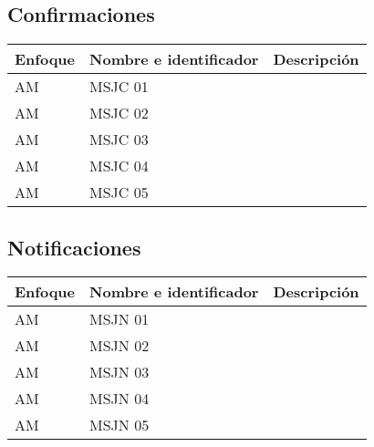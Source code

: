 \subsection{Confirmaciones}
  \begin{center}
   \begin{tabular}{|p{1.5cm}|p{4cm}|p{7cm}|}
     \hline
       \textbf{Enfoque}&\textbf{Nombre e identificador} & \textbf{Descripción} \\ \hline
       \label{msjc_} AM & MSJC 01 & \\ \hline
       \label{msjc_} AM & MSJC 02 & \\ \hline
       \label{msjc_} AM & MSJC 03 & \\ \hline
       \label{msjc_} AM & MSJC 04 & \\ \hline
       \label{msjc_} AM & MSJC 05 & \\ \hline
   \end{tabular}
    \label{tab:msjc}
 \end{center}  
 
\subsection{Notificaciones}
  \begin{center}
   \begin{tabular}{|p{1.5cm}|p{4cm}|p{7cm}|}
     \hline
       \textbf{Enfoque}&\textbf{Nombre e identificador} & \textbf{Descripción} \\ \hline
       \label{msjn_} AM & MSJN 01 & \\ \hline
       \label{msjn_} AM & MSJN 02 & \\ \hline
       \label{msjn_} AM & MSJN 03 & \\ \hline
       \label{msjn_} AM & MSJN 04 & \\ \hline
       \label{msjn_} AM & MSJN 05 & \\ \hline
   \end{tabular}
    \label{tab:msjn}
 \end{center}  
